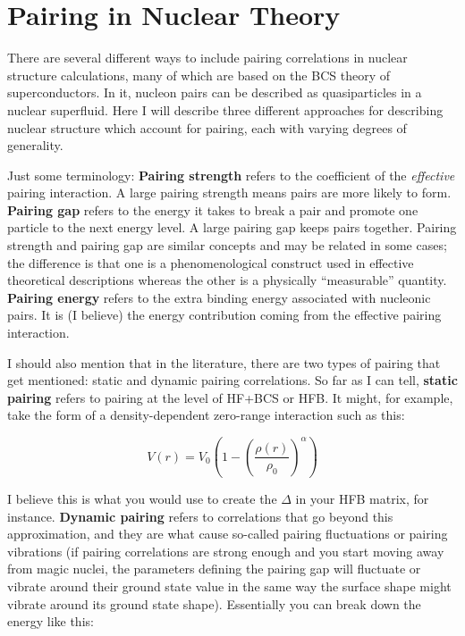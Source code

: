 \chapter{Pairing in Nuclear Theory}

\maketitle
There are several different ways to include pairing correlations in nuclear structure calculations, many of which are based on the BCS theory of superconductors. In it, nucleon pairs can be described as quasiparticles in a nuclear superfluid. Here I will describe three different approaches for describing nuclear structure which account for pairing, each with varying degrees of generality.

Just some terminology: \textbf{Pairing strength} refers to the coefficient of the \textit{effective} pairing interaction. A large pairing strength means pairs are more likely to form. \textbf{Pairing gap} refers to the energy it takes to break a pair and promote one particle to the next energy level. A large pairing gap keeps pairs together. Pairing strength and pairing gap are similar concepts and may be related in some cases; the difference is that one is a phenomenological construct used in effective theoretical descriptions whereas the other is a physically ``measurable'' quantity. \textbf{Pairing energy} refers to the extra binding energy associated with nucleonic pairs. It is (I believe) the energy contribution coming from the effective pairing interaction.

I should also mention that in the literature, there are two types of pairing that get mentioned: static and dynamic pairing correlations. So far as I can tell, \textbf{static pairing} refers to pairing at the level of HF+BCS or HFB. It might, for example, take the form of a density-dependent zero-range interaction such as this:

\begin{equation*}
V(r) = V_0\left(1-\left(\frac{\rho(r)}{\rho_0}\right)^\alpha\right)
\end{equation*}

\noindent I believe this is what you would use to create the $\Delta$ in your HFB matrix, for instance. \textbf{Dynamic pairing} refers to correlations that go beyond this approximation, and they are what cause so-called pairing fluctuations or pairing vibrations (if pairing correlations are strong enough and you start moving away from magic nuclei, the parameters defining the pairing gap will fluctuate or vibrate around their ground state value in the same way the surface shape might vibrate around its ground state shape). Essentially you can break down the energy like this:

